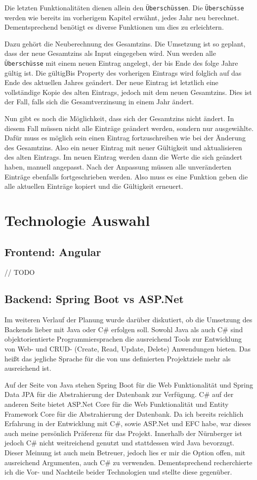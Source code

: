 Die letzten Funktionalitäten dienen allein den \texttt{Überschüssen}. Die \texttt{Überschüsse} werden wie bereits im vorherigem Kapitel erwähnt, jedes Jahr neu berechnet.
Dementsprechend benötigt es diverse Funktionen um dies zu erleichtern. 

Dazu gehört die Neuberechnung des Gesamtzins. Die Umsetzung ist so geplant, dass der neue Gesamtzins als Input eingegeben wird.
Nun werden alle \texttt{Überschüsse} mit einem neuen Eintrag angelegt, der bis Ende des folge Jahre gültig ist. Die gültigBis Property des vorherigen Eintrags wird folglich auf das Ende des aktuellen Jahres geändert.
Der neue Eintrag ist letztlich eine vollständige Kopie des alten Eintrags, jedoch mit dem neuen Gesamtzins. Dies ist der Fall, falls sich die Gesamtverzinsung in einem Jahr ändert.

Nun gibt es noch die Möglichkeit, dass sich der Gesamtzins nicht ändert. In diesem Fall müssen nicht alle Einträge geändert werden, sondern nur ausgewählte. 
Dafür muss es möglich sein einen Eintrag fortzuschreiben wie bei der Änderung des Gesamtzins. Also ein neuer Eintrag mit neuer Gültigkeit und aktualisieren des alten Eintrags.
Im neuen Eintrag werden dann die Werte die sich geändert haben, manuell angepasst. Nach der Anpassung müssen alle unveränderten Einträge ebenfalls fortgeschrieben werden. 
Also muss es eine Funktion geben die alle aktuellen Einträge kopiert und die Gültigkeit erneuert.


\section{Technologie Auswahl}
\subsection{Frontend: Angular}
// TODO
\subsection{Backend: Spring Boot vs ASP.Net}
Im weiteren Verlauf der Planung wurde darüber diskutiert, ob die Umsetzung des Backends lieber mit Java oder C\# erfolgen soll. 
Sowohl Java als auch C\# sind objektorientierte Programmiersprachen die ausreichend Tools zur Entwicklung von Web- und CRUD- (Create, Read, Update, Delete) Anwendungen bieten.
Das heißt das jegliche Sprache für die von uns definierten Projektziele mehr als ausreichend ist.

Auf der Seite von Java stehen Spring Boot für die Web Funktionalität und Spring Data JPA für die Abstrahierung der Datenbank zur Verfügung.
C\# auf der anderen Seite bietet ASP.Net Core für die Web Funktionalität und Entity Framework Core für die Abstrahierung der Datenbank.
Da ich bereits reichlich Erfahrung in der Entwicklung mit C\#, sowie ASP.Net und EFC habe, war dieses auch meine persönlich Präferenz für das Projekt.
Innerhalb der Nürnberger ist jedoch C\# nicht weitreichend genutzt und stattdessen wird Java bevorzugt. Dieser Meinung ist auch mein Betreuer, jedoch lies er mir die Option offen, mit 
ausreichend Argumenten, auch C\# zu verwenden. 
Dementsprechend recherchierte ich die Vor- und Nachteile beider Technologien und stellte diese gegenüber.

